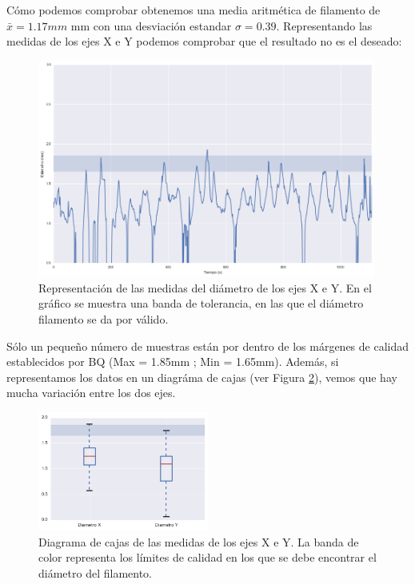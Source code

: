 Cómo podemos comprobar obtenemos una media aritmética de filamento de $ \bar{x} = 1.17mm $  mm con una desviación estandar $\sigma = 0.39$. Representando las medidas de los ejes X e Y podemos comprobar que el resultado no es el deseado:

\begin{figure}[H]
	\centering
	\includegraphics[width=0.99\textwidth]{images/producciones/16062015/output_9_1.png}
	\caption[Representación de las medidas del diámetro de los ejes X e Y.]{Representación de las medidas del diámetro de los ejes X e Y. En el gráfico se muestra una banda de tolerancia, en las que el diámetro filamento se da por válido.}
	\label{fig:prod_ejes}
\end{figure}

Sólo un pequeño número de muestras están por dentro de los márgenes de calidad establecidos por BQ (Max = 1.85mm ; Min = 1.65mm). Además, si representamos los datos en un diagráma de cajas (ver Figura \ref{fig:prod_boxplot}), vemos que hay mucha variación entre los dos ejes.
\begin{figure}[H]
    \centering
    \includegraphics[width=0.5\textwidth]{images/producciones/16062015/output_10_1.png}
    \caption{Diagrama de cajas de las medidas de los ejes X e Y. La banda de color representa los límites de calidad en los que se debe encontrar el diámetro del filamento.}
    \label{fig:prod_boxplot}
\end{figure}

